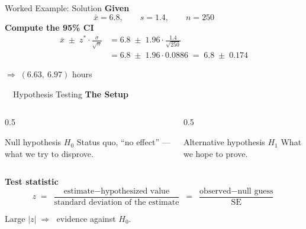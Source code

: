 \documentclass[aspectratio=169,11pt]{beamer}
\begin{document}
\begin{frame}{Worked Example: Solution}
  \textbf{\color{qrnavy}Given}
  \begin{equation*}
    \bar{x} = 6.8, \qquad s = 1.4, \qquad n = 250
  \end{equation*}
  \vspace{0.2em}
  \textbf{\color{qrnavy}Compute the 95\% CI}
  \begin{align*}
    \bar{x} \;\pm\; z^{*}\cdot\frac{\sigma}{\sqrt{n}}
      &= 6.8 \;\pm\; 1.96\cdot\frac{1.4}{\sqrt{250}}\\[0.3em]
      &= 6.8 \;\pm\; 1.96\cdot 0.0886
       \;=\; 6.8 \;\pm\; 0.174
  \end{align*}
  \vspace{0.1em}
  \begin{center}
  \begin{tcolorbox}[colback=qrlight,colframe=qrnavy,arc=2pt,boxrule=0.6pt,width=0.6\textwidth,halign=center]
    $\Rightarrow\; (6.63,\ 6.97)$ hours
  \end{tcolorbox}
  \end{center}
\end{frame}

\begin{frame}{\ \ Hypothesis Testing}
  \textbf{\color{qrnavy}The Setup}
  \begin{columns}[T]
    \begin{column}{0.5\textwidth}
      \begin{block}{Null hypothesis $H_0$}
        Status quo, ``no effect'' --- what we try to disprove.
      \end{block}
    \end{column}
    \begin{column}{0.5\textwidth}
      \begin{block}{Alternative hypothesis $H_1$}
        What we hope to prove.
      \end{block}
    \end{column}
  \end{columns}
  \vspace{0.6em}
  \textbf{\color{qrnavy}Test statistic}
  \begin{equation*}
    z \;=\; \frac{\text{estimate} - \text{hypothesized value}}{\text{standard deviation of the estimate}}
      \;=\; \frac{\text{observed} - \text{null guess}}{\text{SE}}
  \end{equation*}
  \begin{center}
    Large $|z| \;\Rightarrow\;$ evidence against $H_0$.
  \end{center}
\end{frame}
\end{document}
